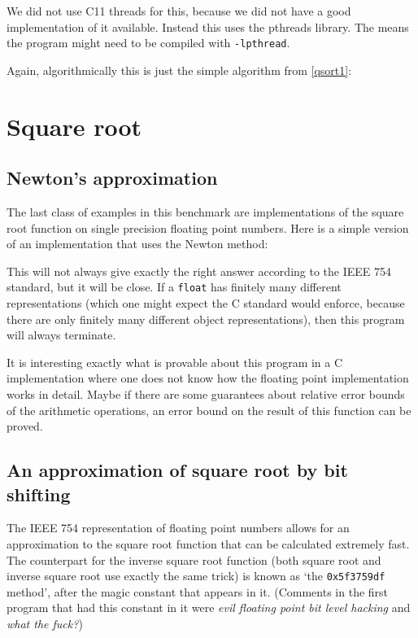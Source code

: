 \documentclass{article}
\begin{document}
We did not use C11 threads for this, because we did not have a good implementation of it available.
Instead this uses the pthreads library.
The means the program might need to be compiled
with \lstinline{-lpthread}.

Again, algorithmically this is just the simple algorithm from \ref{qsort1}:


\section{Square root}
\subsection{Newton's approximation}
The last class of examples in this benchmark are implementations
of the square root function on single precision floating point numbers.
Here is a simple version of an implementation that uses the Newton method:

This will not always give exactly the right answer according to the IEEE 754
standard, but it will be close.
If a \lstinline|float| has finitely many different representations
(which one might expect the C standard would enforce, because there are only
finitely many different object representations), then this program will
always terminate.

It is interesting exactly what is provable about this program
in a C implementation where one does not know how the floating
point implementation works in detail.
Maybe if there are some guarantees about relative error bounds
of the arithmetic operations, an error bound on the result of this
function can be proved.

\subsection{An approximation of square root by bit shifting}
The IEEE 754 representation of floating point numbers allows
for an approximation to the square root function
that can be calculated extremely fast.
The counterpart for the inverse square root function (both square
root and inverse square root
use exactly the same trick) is known
as `the \lstinline|0x5f3759df| method',
after the magic constant that appears in it.
(Comments in the first program that had this constant
in it were \emph{evil floating point bit level hacking} and \emph{what the fuck?})
\end{document}
